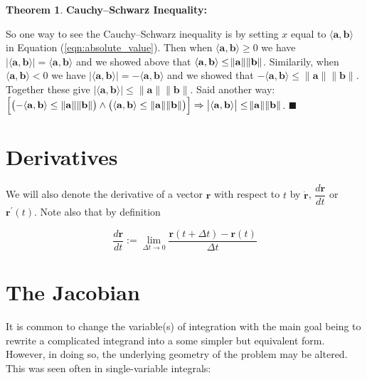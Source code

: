 \documentclass{article}
\theoremstyle{definition}
\newtheorem{theorem}{Theorem}[section]
\begin{document}
\begin{theorem} {\bf Cauchy–Schwarz Inequality:}
\bigskip
{
\noindent
So one way to see the Cauchy–Schwarz inequality is by setting $x$
equal to $\langle \mathbf{a},\mathbf{b} \rangle$ in Equation
(\ref{eqn:absolute_value}). Then when 
$\langle
\mathbf{a},\mathbf{b} \rangle \geq 0$ we have $\big | \langle
\mathbf{a},\mathbf{b} \rangle \big | = \langle
\mathbf{a},\mathbf{b} 
\rangle$ 
and we showed above that $\langle
\mathbf{a},\mathbf{b} \rangle \leq \norm{\mathbf{a}} \norm{\mathbf{b}}$.  
Similarily, when $\langle \mathbf{a},\mathbf{b} \rangle <
0$ we have $\big | \langle \mathbf{a}, \mathbf{b} \rangle \big |
= - \langle \mathbf{a},\mathbf{b} \rangle$ and we showed that $-
\langle \mathbf{a},\mathbf{b} \rangle \leq \|\mathbf{a}\|
\|\mathbf{b} \|$.  Together these give $\big | \langle
\mathbf{a},\mathbf{b} \rangle \big | \leq \|\mathbf{a}\|
\|\mathbf{b} \|$. Said another way:
$\left [ \left (- \langle \mathbf{a},\mathbf{b} \rangle \leq 
\|\mathbf{a}\| \|\mathbf{b} \| \right ) \land \left ( \langle\mathbf{a},
\mathbf{b} \rangle \leq \|\mathbf{a}\| \|\mathbf{b} \| \right )  \right ]
\Rightarrow \big | \langle \mathbf{a},\mathbf{b} \rangle \big |  
\leq \norm{\mathbf{a}} \norm{\mathbf{b}}$. $\blacksquare$
\par}
\end{theorem}

\section{Derivatives}
We will also denote the derivative of a vector $\mathbf{r}$ with
respect to $t$ by $\dot{\mathbf{r}}$, $\dfrac{d\mathbf{r}}{dt}$
or $\mathbf{r}^{\prime}(t)$.  Note also that by definition

\bigskip
\begin{equation*}
\dfrac{d\mathbf{r}}{dt} := \lim_{\Delta t \to 0}			
			\dfrac{\mathbf{r}(t + \Delta t) - \mathbf{r}(t)}{\Delta t}
\end{equation*}

\section{The Jacobian}
It is common to change the variable(s) of integration with the main
goal being to rewrite a complicated integrand into a some simpler
but equivalent form. However, in doing so, the underlying geometry of
the problem may be altered. This was seen often in
single-variable integrals:
\end{document}
